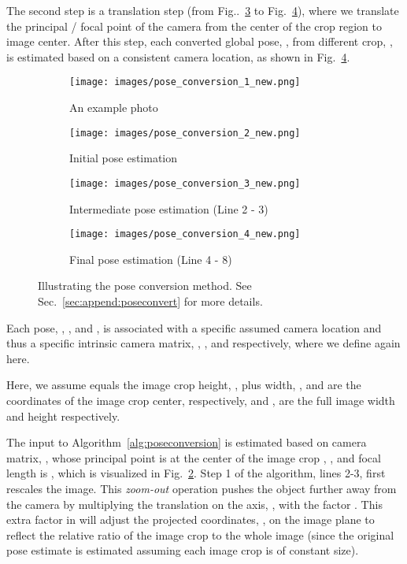 \documentclass[final]{cvpr}
\begin{document}
The second step is a translation step (from Fig..~\ref{fig:intermediate_pose} to Fig.~\ref{fig:final_pose}), where we translate the principal / focal point of the camera from the center of the crop region to image center. After this step, each converted global pose, , from different crop, , is estimated based on a consistent camera location, as shown in Fig.~\ref{fig:final_pose}. 


\begin{figure*}[!t]
    \centering
    \begin{subfigure}{.45\textwidth}
      \centering
      \texttt{[image: images/pose\_conversion\_1\_new.png]}  
      \caption{An example photo}
      \label{fig:pose_photo}
    \end{subfigure}
    \begin{subfigure}{.45\textwidth}
      \centering
      \texttt{[image: images/pose\_conversion\_2\_new.png]}  
      \caption{Initial pose estimation }
      \label{fig:initial_pose}
    \end{subfigure}
    \newline
    \begin{subfigure}{.45\textwidth}
      \centering
      \texttt{[image: images/pose\_conversion\_3\_new.png]}  
      \caption{Intermediate pose estimation  (Line 2 - 3)}
      \label{fig:intermediate_pose}
    \end{subfigure}
    \begin{subfigure}{.45\textwidth}
      \centering
      \texttt{[image: images/pose\_conversion\_4\_new.png]}  
      \caption{Final pose estimation  (Line 4 - 8)}
      \label{fig:final_pose}
    \end{subfigure}
    \caption{Illustrating the pose conversion method. See Sec.~\ref{sec:append:poseconvert} for more details.}
    \label{fig:fig}
\end{figure*}

Each pose, , , and , is associated with a specific assumed camera location and thus a specific intrinsic camera matrix, , , and  respectively, where we define again here. 

Here, we assume  equals the image crop height, , plus width, ,  and  are the  coordinates of the image crop center, respectively, and ,  are the full image width and height respectively.



The input to Algorithm~\ref{alg:poseconversion}  is estimated based on camera matrix, , whose principal point is at the center of the image crop , , and focal length  is , which is visualized in Fig.~\ref{fig:initial_pose}.
Step 1 of the algorithm, lines 2-3, first rescales the image. This {\em zoom-out} operation pushes the object further away from the camera by multiplying the translation on the  axis, , with the factor . This extra factor in  will adjust the projected coordinates, , on the image plane to reflect the relative ratio of the image crop to the whole image (since the original pose estimate  is estimated assuming each image crop is of constant size).
\end{document}
